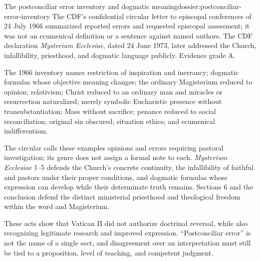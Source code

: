 \begin{heresydossier}{The postconciliar error inventory and dogmatic meaning}{dossier:postconciliar-error-inventory}
\objectfield The CDF's confidential circular letter to episcopal conferences of 24 July 1966 summarized reported errors and requested episcopal assessment; it was not an ecumenical definition or a sentence against named authors. The CDF declaration \emph{Mysterium Ecclesiae}, dated 24 June 1973, later addressed the Church, infallibility, priesthood, and dogmatic language publicly. Evidence grade A.

\propositionfield The 1966 inventory names restriction of inspiration and inerrancy; dogmatic formulas whose objective meaning changes; the ordinary Magisterium reduced to opinion; relativism; Christ reduced to an ordinary man and miracles or resurrection naturalized; merely symbolic Eucharistic presence without transubstantiation; Mass without sacrifice; penance reduced to social reconciliation; original sin obscured; situation ethics; and ecumenical indifferentism.

\responsefield The circular calls these examples opinions and errors requiring pastoral investigation; its genre does not assign a formal note to each. \emph{Mysterium Ecclesiae} 1--5 defends the Church's concrete continuity, the infallibility of faithful and pastors under their proper conditions, and dogmatic formulas whose expression can develop while their determinate truth remains. Sections 6 and the conclusion defend the distinct ministerial priesthood and theological freedom within the word and Magisterium.

\aftermathfield These acts show that Vatican II did not authorize doctrinal reversal, while also recognizing legitimate research and improved expression. ``Postconciliar error'' is not the name of a single sect, and disagreement over an interpretation must still be tied to a proposition, level of teaching, and competent judgment.
\end{heresydossier}

